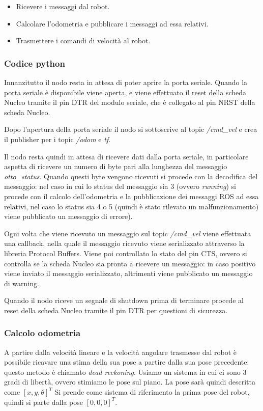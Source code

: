\begin{itemize}
    \item Ricevere i messaggi dal robot.
    \item Calcolare l'odometria e pubblicare i messaggi ad essa relativi.
    \item Trasmettere i comandi di velocità al robot.
\end{itemize}

\subsubsection{Codice python}
Innanzitutto il nodo resta in attesa di poter aprire la porta seriale. Quando la porta seriale è disponibile viene aperta, e viene effettuato il reset della scheda Nucleo tramite il pin DTR del modulo seriale, che è collegato al pin NRST della scheda Nucleo.

Dopo l'apertura della porta seriale il nodo si sottoscrive al topic \textit{/cmd\_vel} e crea il publisher per i topic \textit{/odom} e \textit{tf}.

Il nodo resta quindi in attesa di ricevere dati dalla porta seriale, in particolare aspetta di ricevere un numero di byte pari alla lunghezza del messaggio \textit{otto\_status}. Quando questi byte vengono ricevuti si procede con la decodifica del messaggio: nel caso in cui lo status del messaggio sia 3 (ovvero \textit{running}) si procede con il calcolo dell'odometria e la pubblicazione dei messaggi ROS ad essa relativi, nel caso lo status sia 4 o 5 (quindi è stato rilevato un malfunzionamento) viene pubblicato un messaggio di errore).

Ogni volta che viene ricevuto un messaggio sul topic \textit{/cmd\_vel} viene effettuata una callback, nella quale il messaggio ricevuto viene serializzato attraverso la libreria Protocol Buffers. Viene poi controllato lo stato del pin CTS, ovvero si controlla se la scheda Nucleo sia pronta a ricevere un messaggio: in caso positivo viene inviato il messaggio serializzato, altrimenti viene pubblicato un messaggio di warning.

Quando il nodo riceve un segnale di shutdown prima di terminare procede al reset della scheda Nucleo tramite il pin DTR per questioni di sicurezza.

\subsubsection{Calcolo odometria}
A partire dalla velocità lineare e la velocità angolare trasmesse dal robot è possibile ricavare una stima della sua pose a partire dalla sua pose precedente: questo metodo è chiamato \textit{dead reckoning}.
Usiamo un sistema in cui ci sono 3 gradi di libertà, ovvero stimiamo le pose sul piano. La pose sarà quindi descritta come $[x,y,\theta]^T$
Si prende come sistema di riferimento la prima pose del robot, quindi si parte dalla pose $[0,0,0]^T$.

